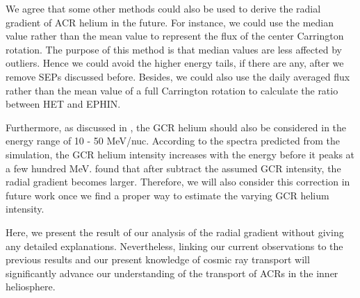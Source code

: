 We agree that some other methods could also be used to derive the radial gradient of \ac{ACR} helium in the future. For instance, we could use the median value rather than the mean value to represent the flux of the center Carrington rotation. The purpose of this method is that median values are less affected by outliers. Hence we could avoid the higher energy tails, if there are any, after we remove \acp{SEP} discussed before. Besides, we could also use the daily averaged flux rather than the mean value of a full Carrington rotation to calculate the ratio between \ac{HET} and \ac{EPHIN}. 


Furthermore, as discussed in \citet{Rankin2021ApJ}, the \ac{GCR} helium should also be considered in the energy range of 10 - 50 MeV/nuc. According to the spectra predicted from the simulation, the \ac{GCR} helium intensity increases with the energy before it peaks at a few hundred MeV. \citet{Rankin2021ApJ} found that after subtract the assumed \ac{GCR} intensity, the radial gradient becomes larger. Therefore, we will also consider this correction in future work once we find a proper way to estimate the varying \ac{GCR} helium intensity.

Here, we present the result of our analysis of the radial gradient without giving any detailed explanations. Nevertheless, linking our current observations to the previous results and our present knowledge of cosmic ray transport will significantly advance our understanding of the transport of \acp{ACR} in the inner heliosphere.




